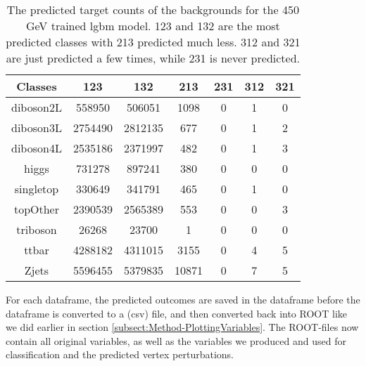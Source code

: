 \documentclass[a4paper, american, 12pt]{report}
\begin{document}
	\begin{table}[htbp!]
		\centering
		\begin{tabular}{ |c|c|c|c|c|c|c| }
			\hline \rule{0pt}{13pt}
			Classes & 123 & 132 & 213 & 231 & 312 & 321 \\
			\hline \rule{0pt}{13pt}
			diboson2L & 558950 & 506051 & 1098 & 0 & 1 & 0 \\
			\hline \rule{0pt}{13pt}
			diboson3L & 2754490 & 2812135 & 677 & 0 & 1 & 2 \\
			\hline \rule{0pt}{13pt}
			diboson4L & 2535186 & 2371997 & 482 & 0 & 1 & 3 \\
			\hline \rule{0pt}{13pt}
			higgs & 731278 & 897241 & 380 & 0 & 0 & 0 \\
			\hline \rule{0pt}{13pt}
			singletop & 330649 & 341791 & 465 & 0 & 1 & 0 \\
			\hline \rule{0pt}{13pt}
			topOther & 2390539 & 2565389 & 553 & 0 & 0 & 3 \\
			\hline \rule{0pt}{13pt}
			triboson & 26268 & 23700 & 1 & 0 & 0 & 0 \\
			\hline \rule{0pt}{13pt}
			ttbar & 4288182 & 4311015 & 3155 & 0 & 4 & 5 \\
			\hline \rule{0pt}{13pt}
			Zjets & 5596455 & 5379835 & 10871 & 0 & 7 & 5 \\
			\hline
		\end{tabular}	      
		\caption[Target counts of backgrounds for 450 GeV trained classifier.]{The predicted target counts of the backgrounds for the 450 GeV trained \acrshort{lgbm} model. 123 and 132 are the most predicted classes with 213 predicted much less. 312 and 321 are just predicted a few times, while 231 is never predicted.}
		\label{tab:Counts_450_Ntuples}
	\end{table}
	
	
	For each dataframe, the predicted outcomes are saved in the dataframe before the dataframe is converted to a (\acrshort{csv}) file, and then converted back into ROOT like we did earlier in section \ref{subsect:Method-PlottingVariables}. The ROOT-files now contain all original variables, as well as the variables we produced and used for classification and the predicted vertex perturbations. 
	
	
\end{document}

